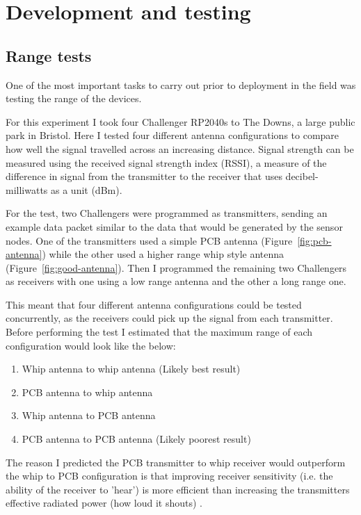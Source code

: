 \section{Development and testing}

\subsection{Range tests}\label{sec:range-tests}

One of the most important tasks to carry out prior to deployment in the field
was testing the range of the devices.

For this experiment I took four Challenger RP2040s to The Downs, a large public
park in Bristol. Here I tested four different antenna configurations to compare
how well the signal travelled across an increasing distance. Signal strength can
be measured using the received signal strength index (RSSI), a measure of the
difference in signal from the transmitter to the receiver that uses
decibel-milliwatts as a unit (dBm).

For the test, two Challengers were programmed as transmitters, sending an
example data packet similar to the data that would be generated by the sensor
nodes. One of the transmitters used a simple PCB antenna
(Figure~\ref{fig:pcb-antenna}) while the other used a higher range whip style
antenna (Figure~\ref{fig:good-antenna}). Then I programmed the remaining two
Challengers as receivers with one using a low range antenna and the other a long
range one.

This meant that four different antenna configurations could be tested
concurrently, as the receivers could pick up the signal from each transmitter.
Before performing the test I estimated that the maximum range of each
configuration would look like the below:

\begin{enumerate}
    \item Whip antenna to whip antenna (Likely best result)
    \item PCB antenna to whip antenna
    \item Whip antenna to PCB antenna
    \item PCB antenna to PCB antenna (Likely poorest result)
\end{enumerate}

The reason I predicted the PCB transmitter to whip receiver would outperform the
whip to PCB configuration is that improving receiver sensitivity (i.e. the
ability of the receiver to 'hear') is more efficient than increasing the
transmitters effective radiated power (how loud it shouts) \cite{simpulse25}.

